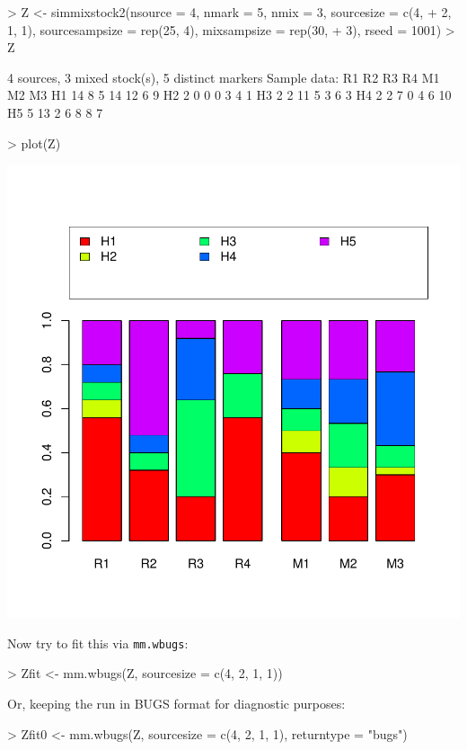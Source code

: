 \documentclass[11pt]{article}
\begin{document}
\begin{Schunk}
\begin{Sinput}
> Z <- simmixstock2(nsource = 4, nmark = 5, nmix = 3, sourcesize = c(4, 
+     2, 1, 1), sourcesampsize = rep(25, 4), mixsampsize = rep(30, 
+     3), rseed = 1001)
> Z
\end{Sinput}
\begin{Soutput}
4 sources, 3 mixed stock(s), 5 distinct markers
Sample data:
   R1 R2 R3 R4 M1 M2 M3
H1 14  8  5 14 12  6  9
H2  2  0  0  0  3  4  1
H3  2  2 11  5  3  6  3
H4  2  2  7  0  4  6 10
H5  5 13  2  6  8  8  7
\end{Soutput}
\begin{Sinput}
> plot(Z)
\end{Sinput}
\end{Schunk}
\includegraphics{mixstock-034}


Now try to fit this via {\tt mm.wbugs}:
\begin{Schunk}
\begin{Sinput}
> Zfit <- mm.wbugs(Z, sourcesize = c(4, 2, 1, 1))
\end{Sinput}
\end{Schunk}

Or, keeping the run in BUGS format for diagnostic purposes:
\begin{Schunk}
\begin{Sinput}
> Zfit0 <- mm.wbugs(Z, sourcesize = c(4, 2, 1, 1), returntype = "bugs")
\end{Sinput}
\end{Schunk}
\end{document}
